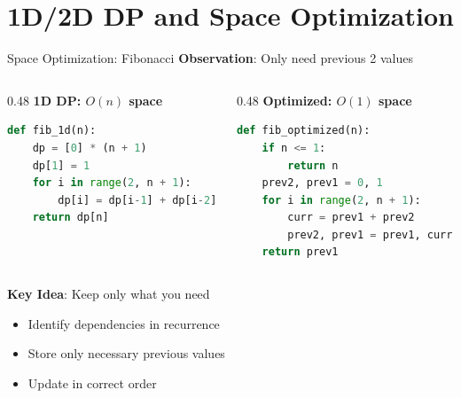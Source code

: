 \documentclass[aspectratio=169]{beamer}
\begin{document}
\section{1D/2D DP and Space Optimization}

\begin{frame}[fragile]{Space Optimization: Fibonacci}
  \textbf{Observation}: Only need previous 2 values

\begin{columns}
\begin{column}{0.48\textwidth}
\textbf{1D DP: $O(n)$ space}
\begin{lstlisting}[language=Python, basicstyle=\ttfamily\tiny]
def fib_1d(n):
    dp = [0] * (n + 1)
    dp[1] = 1
    for i in range(2, n + 1):
        dp[i] = dp[i-1] + dp[i-2]
    return dp[n]
\end{lstlisting}
\end{column}

\begin{column}{0.48\textwidth}
\textbf{Optimized: $O(1)$ space}
\begin{lstlisting}[language=Python, basicstyle=\ttfamily\tiny]
def fib_optimized(n):
    if n <= 1:
        return n
    prev2, prev1 = 0, 1
    for i in range(2, n + 1):
        curr = prev1 + prev2
        prev2, prev1 = prev1, curr
    return prev1
\end{lstlisting}
\end{column}
\end{columns}

\vspace{0.5cm}

\textbf{Key Idea}: Keep only what you need
\begin{itemize}
  \item Identify dependencies in recurrence
  \item Store only necessary previous values
  \item Update in correct order
\end{itemize}
\end{frame}
\end{document}
